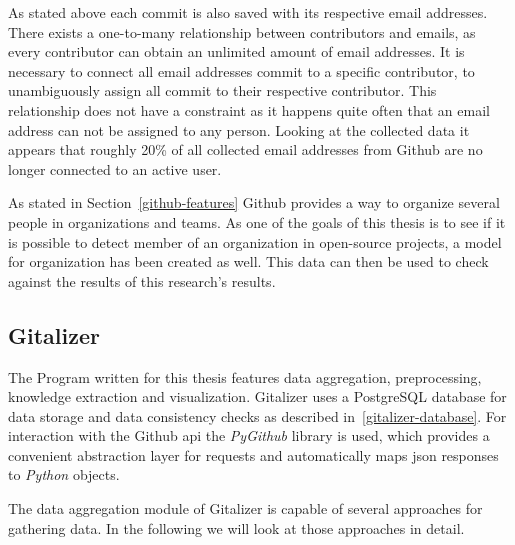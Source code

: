As stated above each commit is also saved with its respective email addresses.
There exists a one-to-many relationship between contributors and emails, as every contributor can obtain an unlimited amount of email addresses.
It is necessary to connect all email addresses commit to a specific contributor, to unambiguously assign all commit to their respective contributor.
This relationship does not have a  constraint as it happens quite often that an email address can not be assigned to any person.
Looking at the collected data it appears that roughly 20\% of all collected email addresses from Github are no longer connected to an active user.

As stated in Section~\ref{github-features} Github provides a way to organize several people in organizations and teams.
As one of the goals of this thesis is to see if it is possible to detect member of an organization in open-source projects, a model for organization has been created as well.
This data can then be used to check against the results of this research's results.


\subsection{Gitalizer}
The Program written for this thesis features data aggregation, preprocessing, knowledge extraction and visualization.
Gitalizer uses a PostgreSQL database for data storage and data consistency checks as described in~\ref{gitalizer-database}.
For interaction with the Github \ac{api} the \emph{PyGithub} library is used, which provides a convenient abstraction layer for requests and automatically maps \ac{json} responses to \emph{Python} objects.

The data aggregation module of Gitalizer is capable of several approaches for gathering data.
In the following we will look at those approaches in detail.

